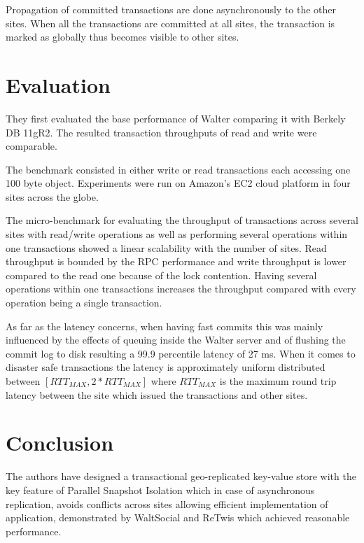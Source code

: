 \documentclass[a4paper]{article}
\begin{document}
Propagation of committed transactions are done asynchronously to the other sites. When all the transactions are committed at all sites, the transaction is marked as globally thus becomes visible to other sites. 

\section{Evaluation}

They first evaluated the base performance of Walter comparing it with Berkely DB 11gR2. The resulted transaction throughputs of read and write were comparable.

The benchmark consisted in either write or read transactions each accessing one 100 byte object. Experiments were run on Amazon's EC2 cloud platform in four sites across the globe. 

The micro-benchmark for evaluating the throughput of transactions across several sites with read/write operations as well as performing several operations within one transactions showed a linear scalability with the number of sites. Read throughput is bounded by the RPC performance and write throughput is lower compared to the read one because of the lock contention. Having several operations within one transactions increases the throughput compared with every operation being a single transaction. 

As far as the latency concerns, when having fast commits this was mainly influenced by the effects of queuing inside the Walter server and of flushing the commit log to disk resulting a 99.9 percentile latency of 27 ms. When it comes to disaster safe transactions the latency is approximately uniform distributed between $[RTT_{MAX},2*RTT_{MAX}]$ where $RTT_{MAX}$ is the maximum round trip latency between the site which issued the transactions and other sites.


\section{Conclusion}

The authors have designed a transactional geo-replicated key-value store with the key feature of Parallel Snapshot Isolation which in case of asynchronous replication, avoids conflicts across sites allowing efficient implementation of application, demonstrated by WaltSocial and ReTwis which achieved reasonable performance.  
\end{document}
